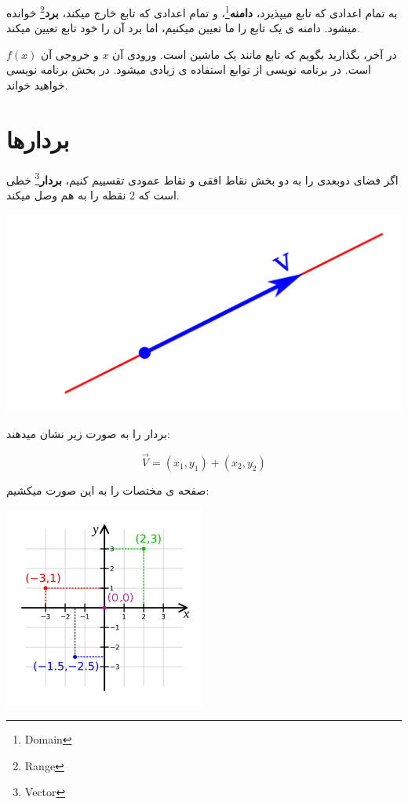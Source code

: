 \documentclass[14pt,a4paper]{memoir}
\begin{document}
به تمام اعدادی که تابع میپذیرد، \textbf{دامنه}\footnote{Domain}، و تمام اعدادی که تابع خارج میکند، \textbf{برد}\footnote{Range} خوانده میشود. دامنه ی یک تابع را ما تعیین میکنیم، اما برد آن را خود تابع تعیین میکند.

در آخر، بگذارید بگویم که تابع مانند یک ماشین است. ورودی آن $ x $ و خروجی آن $ f(x) $ است. در برنامه نویسی از توابع استفاده ی زیادی میشود. در بخش برنامه نویسی خواهید خواند.

\section{بردارها}\label{vector}

اگر فضای دوبعدی را به دو بخش نقاط افقی و نقاط عمودی تقسییم کنیم، \textbf{بردار}\footnote{Vector} خطی است که 2 نقطه را به هم وصل میکند.

\includegraphics*[scale=0.3]{Vector} 

بردار را به صورت زیر نشان میدهند:

\[ \vec{V} = (x_1, y_1) + (x_2, y_2) \]
	 
	 صفحه ی مختصات را به این صورت میکشیم: \vfill
	 \begin{center}
	 	\includegraphics*[scale = 1]{coordinate_system}
	 \end{center}
	 
\end{document}
